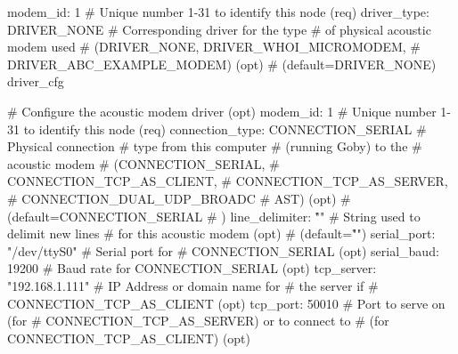 \documentclass[11pt, letterpaper, oneside]{memoir}
\begin{document}
\begin{boxedverbatim}
{{  }
  modem_id: 1  # Unique number 1-31 to identify this node (req)
  driver_type: DRIVER_NONE  # Corresponding driver for the type 
                            # of physical acoustic modem used 
                            # (DRIVER_NONE, DRIVER_WHOI_MICROMODEM, 
                            # DRIVER_ABC_EXAMPLE_MODEM) (opt) 
                            # (default=DRIVER_NONE)
  driver_cfg {  # Configure the acoustic modem driver (opt)
    modem_id: 1  # Unique number 1-31 to identify this node (req)
    connection_type: CONNECTION_SERIAL  # Physical connection 
                                        # type from this computer 
                                        # (running Goby) to the 
                                        # acoustic modem 
                                        # (CONNECTION_SERIAL, 
                                        # CONNECTION_TCP_AS_CLIENT, 
                                        # CONNECTION_TCP_AS_SERVER, 
                                        # CONNECTION_DUAL_UDP_BROADC
                                        # AST) (opt) 
                                        # (default=CONNECTION_SERIAL
                                        # )
    line_delimiter: "\r\n"  # String used to delimit new lines 
                            # for this acoustic modem (opt) 
                            # (default="\r\n")
    serial_port: "/dev/ttyS0"  # Serial port for 
                               # CONNECTION_SERIAL (opt)
    serial_baud: 19200  # Baud rate for CONNECTION_SERIAL (opt)
    tcp_server: "192.168.1.111"  # IP Address or domain name for 
                                 # the server if 
                                 # CONNECTION_TCP_AS_CLIENT (opt)
    tcp_port: 50010  # Port to serve on (for 
                     # CONNECTION_TCP_AS_SERVER) or to connect to 
                     # (for CONNECTION_TCP_AS_CLIENT) (opt)
          
}}
\end{boxedverbatim}
\end{document}
